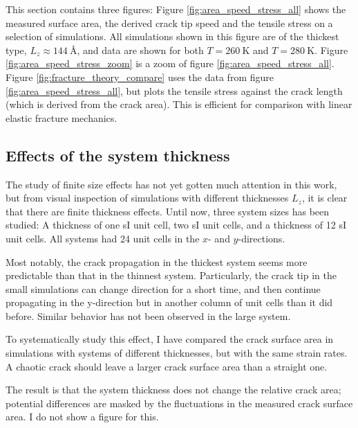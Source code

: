 This section contains three figures:
Figure \ref{fig:area_speed_stress_all} shows the measured surface area, the derived crack tip speed and the tensile stress on a selection of simulations. All simulations shown in this figure are of the thickest type, $L_z \approx \SI{144}{\angstrom}$, and data are shown for both $T = \SI{260}{\kelvin}$ and $T = \SI{280}{\kelvin}$. Figure \ref{fig:area_speed_stress_zoom} is a zoom of figure \ref{fig:area_speed_stress_all}. Figure \ref{fig:fracture_theory_compare} uses the data from figure \ref{fig:area_speed_stress_all}, but plots the tensile stress against the crack length (which is derived from the crack area). This is efficient for comparison with linear elastic fracture mechanics.

\subsection{Effects of the system thickness}
The study of finite size effects has not yet gotten much attention in this work, but from visual inspection of simulations with different thicknesses $L_z$, it is clear that there are finite thickness effects. Until now, three system sizes has been studied: A thickness of one sI unit cell, two sI unit cells, and a thickness of 12 sI unit cells. All systems had 24 unit cells in the $x$- and $y$-directions.

Most notably, the crack propagation in the thickest system seems more predictable than that in the thinnest system. Particularly, the crack tip in the small simulations can change direction for a short time, and then continue propagating in the y-direction but in another column of unit cells than it did before. Similar behavior has not been observed in the large system.

To systematically study this effect, I have compared the crack surface area in simulations with systems of different thicknesses, but with the same strain rates. A chaotic crack should leave a larger crack surface area than a straight one.

The result is that the system thickness does not change the relative crack area; potential differences are masked by the fluctuations in the measured crack surface area. I do not show a figure for this.

